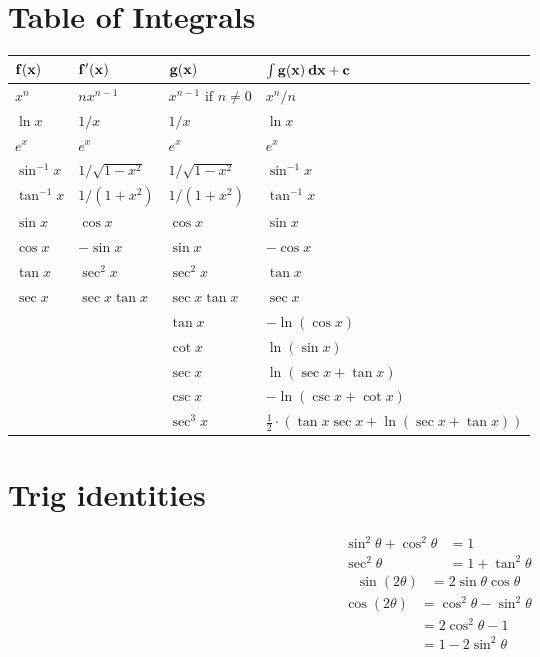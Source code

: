
\appendix
\section{Table of Integrals}
\setlength\extrarowheight{5pt}
\begin{center}
  \begin{tabular}{|l|l|l|l|}
    \hline
    ${\bf f(x)}$ & ${\bf f'(x)}$ & ${\bf g(x)}$ & ${\bf \int g(x) \: dx + c}$ \\ \hline
    $x^n$ & $n x^{n - 1}$ & $x^{n-1} \mbox{ if } n \neq 0$ & ${x^n}/{n}$ \\ \hline
    $\ln x$ & $1/x$ & $1/x$ & $\ln x$ \\
    $e^x$ & $e^x$ & $e^x$ & $e^x$ \\ \hline
    $\sin^{-1} x$ & $1/\sqrt{1-x^2}$ & $1/\sqrt{1-x^2}$ & $\sin^{-1} x$ \\
    $\tan^{-1} x$ & $1/{(1+x^2)}$ & $1/{(1+x^2)}$ & $\tan^{-1} x$ \\ \hline
    $\sin x$ & $\cos x$ & $\cos x$ & $\sin x$ \\
    $\cos x$ & $-\sin x$ & $\sin x$ & $-\cos x$ \\
    $\tan x$ & $\sec^2 x$ & $\sec^2 x$ & $\tan x$ \\
		$\sec x$ & $\sec x \tan x$ & $ \sec x \tan x$ & $\sec x$ \\\hline
		& & $\tan x$ & $- \ln (\cos x)$\\
		& & $\cot x$ & $ \ln (\sin x)$\\
		& & $\sec x$ & $ \ln (\sec x + \tan x)$\\
		& & $\csc x$ & $ -\ln (\csc x + \cot x)$ \\\hline
    & & $\sec^3 x$ &  $\frac{1}{2} \cdot \left(\tan x \sec x + \ln (\sec x + \tan x)\right)$\\\hline
	\end{tabular}
\end{center}

\vspace{2em}
	\section{Trig identities}
	\begin{align*}
			\sin^2 \theta + \cos^2 \theta &= 1 \\
			\sec^2 \theta &= 1 + \tan^2 \theta
	\end{align*}
	\begin{align*}
		\sin (2 \theta)
			&= 2 \sin \theta \cos \theta
	\end{align*}
\begin{align*}
		\cos(2 \theta)
		&= \cos^2 \theta - \sin^2 \theta \\
		&= 2 \cos^2 \theta - 1 \\
		&= 1 - 2 \sin^2 \theta
\end{align*}

